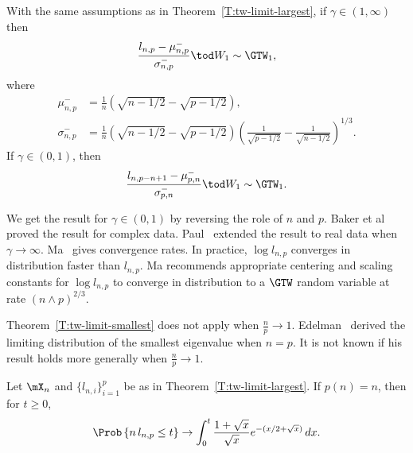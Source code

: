 \begin{theorem}\label{T:tw-limit-smallest}
    With the same assumptions as in Theorem~\ref{T:tw-limit-largest}, if
    $\gamma \in (1,\infty)$ then
    \[
        \frac{l_{n,p} - \mu_{n,p}^-}{\sigma_{n,p}^-}
        \tod
        W_1
        \sim
        \GTW_1,
    \]
    where
    \begin{align*}
        \mu_{n,p}^-
            &=
            \frac{1}{n}
            \left(
                \sqrt{n - 1/2}
                -
                \sqrt{p - 1/2}
            \right), \\
        \sigma_{n,p}^-
            &= 
            \frac{1}{n}
            \left(
                \sqrt{n - 1/2}
                -
                \sqrt{p - 1/2}
            \right)
            \left(
                \frac{1}{\sqrt{p - 1/2}}
                -
                \frac{1}{\sqrt{n - 1/2}}
            \right)^{1/3}.
    \end{align*}
    If $\gamma \in (0, 1)$, then
    \[
        \frac{l_{n,p-n+1} - \mu_{p,n}^-}{\sigma_{p,n}^-}
        \tod
        W_1
        \sim
        \GTW_1.
    \]
\end{theorem}

\noindent
We get the result for $\gamma \in (0,1)$ by reversing the role of $n$ and $p$.
Baker et al~\cite{baker1998rme} proved the result for complex data.
Paul~\cite{paul2006dse} extended the result to real data when $\gamma \to \infty$.  Ma~\cite{ma2008atw} gives convergence rates.  In practice,
$\log l_{n,p}$ converges in distribution faster than $l_{n,p}$.  Ma recommends appropriate centering and scaling constants for $\log l_{n,p}$ to converge in distribution to a $\GTW$ random variable at rate $(n \wedge p)^{2/3}$.

Theorem~\ref{T:tw-limit-smallest} does not apply when $\frac{n}{p} \to 1$.  Edelman~\cite{edelman1988ecn} derived the limiting distribution of the smallest eigenvalue when $n = p$.  It is not known if his result holds more generally when $\frac{n}{p} \to 1$.

\begin{theorem}\label{T:edelman-limit-smallest}
    Let $\mX_n$ and $\{ l_{n,i} \}_{i=1}^p$ be as in 
    Theorem~\ref{T:tw-limit-largest}.  If $p(n) = n$, then for $t \geq 0$,
    \[
        \Prob\left\{
            n \, l_{n,p} \leq t
        \right\}
        \to
        \int_0^t
            \frac{1 + \sqrt{x}}{\sqrt{x}}
            e^{-(x/2 + \sqrt{x})}
            \,
            dx.
    \]
\end{theorem}

